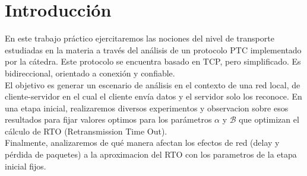 \section{Introducción}
En este trabajo pr\'actico ejercitaremos las nociones del nivel de transporte estudiadas en la materia a
través del análisis de un protocolo PTC implementado por la c\'atedra. Este protocolo se encuentra basado en TCP, pero simplificado. Es bidireccional, orientado a conexi\'on y confiable.\\

El objetivo es generar un escenario de an\'alisis en el contexto de una red local, de cliente-servidor en el cual el cliente env\'ia datos y el servidor solo los reconoce. En una etapa inicial, realizaremos diversos experimentos y observacion sobre esos resultados para fijar valores optimos para los par\'ametros $\alpha$ y $\mathcal{B}$ que optimizan el c\'alculo de RTO (Retransmission Time Out).\\

Finalmente, analizaremos de qu\'e manera afectan los efectos de red (delay y p\'erdida de paquetes) a la aproximacion del RTO con los parametros de la etapa inicial fijos.